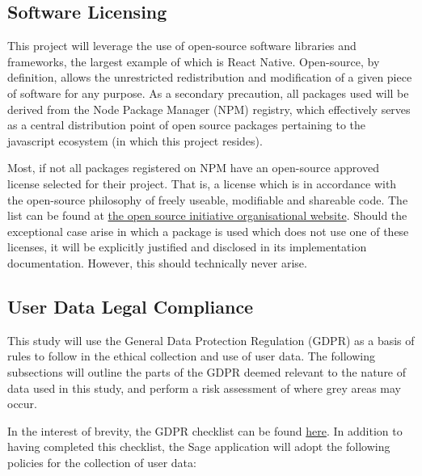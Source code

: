 \subsection{Software Licensing}
This project will leverage the use of open-source software libraries and frameworks, the largest example of which is React Native. Open-source, by definition, allows the unrestricted redistribution and modification of a given piece of software for any purpose. As a secondary precaution, all packages used will be derived from the Node Package Manager (NPM) registry, which effectively serves as a central distribution point of open source packages pertaining to the javascript ecosystem (in which this project resides).

Most, if not all packages registered on NPM have an open-source approved license selected for their project. That is, a license which is in accordance with the open-source philosophy of freely useable, modifiable and shareable code. The list can be found at \href{https://opensource.org/licenses}{the open source initiative organisational website}. Should the exceptional case arise in which a package is used which does not use one of these licenses, it will be explicitly justified and disclosed in its implementation documentation. However, this should technically never arise.

\subsection{User Data Legal Compliance}
This study will use the General Data Protection Regulation (GDPR) as a basis of rules to follow in the ethical collection and use of user data. The following subsections will outline the parts of the GDPR deemed relevant to the nature of data used in this study, and perform a risk assessment of where grey areas may occur.

In the interest of brevity, the GDPR checklist can be found \href{https://gdpr.eu/checklist/}{here}. In addition to having completed this checklist, the Sage application will adopt the following policies for the collection of user data:

